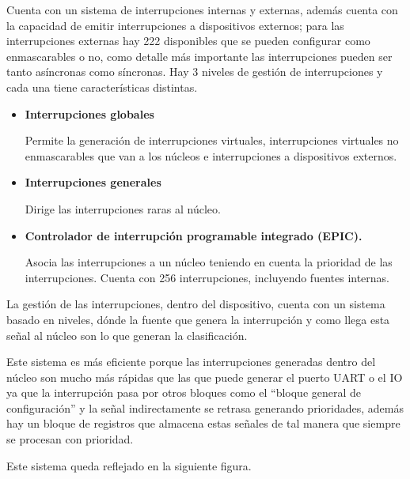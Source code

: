 \documentclass[11pt,a4paper]{article}
\begin{document}
Cuenta con un sistema de interrupciones internas y externas, además cuenta con la capacidad de emitir interrupciones a dispositivos externos; para las interrupciones externas hay 222 disponibles que se pueden configurar como enmascarables o no, como detalle más importante las interrupciones pueden ser tanto asíncronas como síncronas. Hay 3 niveles de gestión de interrupciones y cada una tiene características distintas.
\begin{itemize}
    \item \textbf{Interrupciones globales}
    
    Permite la generación de interrupciones virtuales, interrupciones virtuales no enmascarables que van a los núcleos e interrupciones a dispositivos externos.
    \item \textbf{Interrupciones generales}
    
    Dirige las interrupciones raras al núcleo.
    \item \textbf{Controlador de interrupción programable integrado (EPIC).}
    
    Asocia las interrupciones a un núcleo teniendo en cuenta la prioridad de las interrupciones. Cuenta con 256 interrupciones, incluyendo fuentes internas. 
\end{itemize}

La gestión de las interrupciones, dentro del dispositivo, cuenta con un sistema basado en niveles, dónde la fuente que genera la interrupción y como llega esta señal al núcleo son lo que generan la clasificación. 

Este sistema es más eficiente porque las interrupciones generadas dentro del núcleo son mucho más rápidas que las que puede generar el puerto UART o el IO ya que la interrupción pasa por otros bloques como el ``bloque general de configuración'' y la señal indirectamente se retrasa generando prioridades, además hay un bloque de registros que almacena estas señales de tal manera que siempre se procesan con prioridad. 

Este sistema queda reflejado en la siguiente figura.
\end{document}
